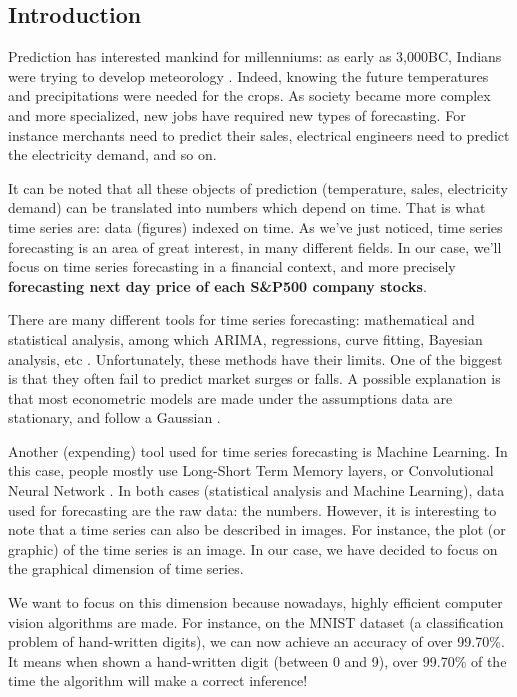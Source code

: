 \documentclass[11pt]{article}
\begin{document}
\begin{onehalfspace}
\pagebreak

\section{Introduction}

Prediction has interested mankind for millenniums: as early as 3,000BC, Indians were trying to develop meteorology \cite{meteo}. Indeed, knowing the future temperatures and precipitations were needed for the crops. As society became more complex and more specialized, new jobs have required new types of forecasting. For instance merchants need to predict their sales, electrical engineers need to predict the electricity demand, and so on. 

It can be noted that all these objects of prediction (temperature, sales, electricity demand) can be translated into numbers which depend on time. That is what time series are: data (figures) indexed on time. As we've just noticed, time series forecasting is an area of great interest, in many different fields. In our case, we'll focus on time series forecasting in a financial context, and more precisely \textbf{forecasting next day price of each S\&P500 company stocks}.

There are many different tools for time series forecasting: mathematical and statistical analysis, among which ARIMA, regressions, curve fitting, Bayesian analysis, etc \cite{campanharo}. Unfortunately, these methods have their limits. One of the biggest is that they often fail to predict market surges or falls. A possible explanation is that most econometric models are made under the assumptions data are stationary, and follow a Gaussian \cite{arima}. 

Another (expending) tool used for time series forecasting is Machine Learning. In this case, people mostly use Long-Short Term Memory layers, or Convolutional Neural Network \cite{conv_lstm}. In both cases (statistical analysis and Machine Learning), data used for forecasting are the raw data: the numbers. However, it is interesting to note that a time series can also be described in images. For instance, the plot (or graphic) of the time series is an image. In our case, we have decided to focus on the graphical dimension of time series.

We want to focus on this dimension because nowadays, highly efficient computer vision algorithms are made. For instance, on the MNIST dataset (a classification problem of hand-written digits), we can now achieve an accuracy of over 99.70\%. It means when shown a hand-written digit (between 0 and 9), over 99.70\% of the time the algorithm will make a correct inference! 


\end{onehalfspace}
\end{document}
